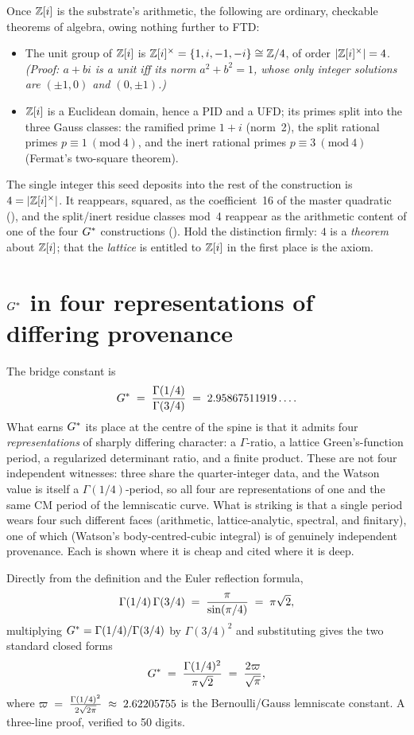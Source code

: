  Once $\mathbb{Z}[i]$ is the substrate's
arithmetic, the following are ordinary, checkable theorems of algebra, owing
nothing further to FTD:
\begin{itemize}[leftmargin=1.4em, itemsep=3pt]
  \item The unit group of $\mathbb{Z}[i]$ is $\mathbb{Z}[i]^{\times}=\{1,i,-1,-i\}\cong\mathbb{Z}/4$, of order
        $|\mathbb{Z}[i]^{\times}|=4$. \emph{(Proof: $a+bi$ is a unit iff its norm $a^2+b^2=1$,
        whose only integer solutions are $(\pm1,0)$ and $(0,\pm1)$.)}
  \item $\mathbb{Z}[i]$ is a Euclidean domain, hence a PID and a UFD; its primes split
        into the three Gauss classes: the ramified prime $1+i$ (norm~2), the
        split rational primes $p\equiv 1\ (\mathrm{mod}\ 4)$, and the inert
        rational primes $p\equiv 3\ (\mathrm{mod}\ 4)$ (Fermat's two-square
        theorem).
\end{itemize}
The single integer this seed deposits into the rest of the construction is
$4=|\mathbb{Z}[i]^{\times}|$. It reappears, squared, as the coefficient~16 of the master quadratic
(), and the split/inert residue classes mod~4 reappear as
the arithmetic content of one of the four $G^{*}$ constructions ().
Hold the distinction firmly: $4$ is a \emph{theorem} about $\mathbb{Z}[i]$; that the
\emph{lattice} is entitled to $\mathbb{Z}[i]$ in the first place is the axiom.

\section{\texorpdfstring{$G^{*}$}{G*} in four representations of differing provenance}\label{sec:gstar}
The bridge constant is
\[ G^{*} \;=\; \frac{\Gamma(1/4)}{\Gamma(3/4)} \;=\; 2.95867511919\ldots. \]
What earns $G^{*}$ its place at the centre of the spine is that it admits four
\emph{representations} of sharply differing character: a $\Gamma$-ratio, a
lattice Green's-function period, a regularized determinant ratio, and a finite
product. These are not four independent witnesses: three share the quarter-integer
data, and the Watson value is itself a $\Gamma(1/4)$-period, so all four are
representations of one and the same CM period of the lemniscatic curve. What is
striking is that a single period wears four such different faces (arithmetic,
lattice-analytic, spectral, and finitary), one of which (Watson's
body-centred-cubic integral) is of genuinely independent provenance. Each is shown
where it is cheap and cited where it is deep.

 Directly from the definition and the
Euler reflection formula,
\[ \Gamma(1/4)\,\Gamma(3/4) \;=\; \frac{\pi}{\sin(\pi/4)} \;=\; \pi\sqrt 2, \]
multiplying $G^{*}=\Gamma(1/4)/\Gamma(3/4)$ by $\Gamma(3/4)^2$ and substituting
gives the two standard closed forms
\[ G^{*} \;=\; \frac{\Gamma(1/4)^2}{\pi\sqrt 2} \;=\; \frac{2\varpi}{\sqrt\pi}, \]
where $\varpi \;=\; \frac{\Gamma(1/4)^2}{2\sqrt{2\pi}} \;\approx\; 2.62205755$ is the Bernoulli/Gauss lemniscate constant. A three-line proof,
verified to 50 digits.

